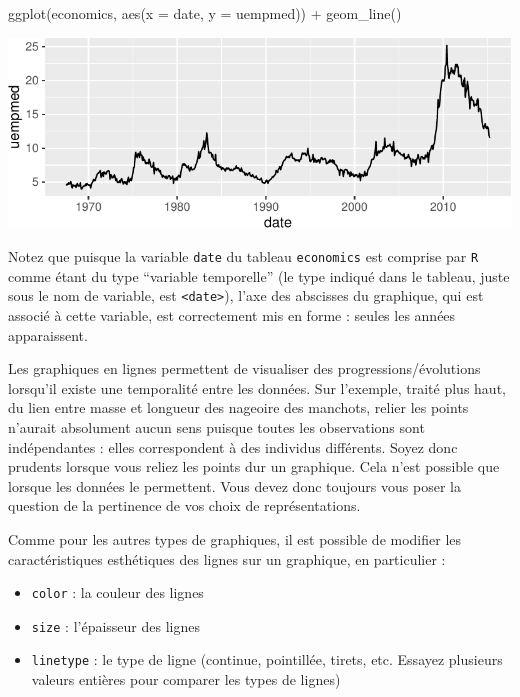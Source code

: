 \documentclass[
  a4paper,
  DIV=11,
  numbers=noendperiod,
  oneside]{scrreprt}
\newenvironment{Shaded}{}{}
\newcommand{\AttributeTok}[1]{\textcolor[rgb]{0.84,0.23,0.29}{#1}}
\newcommand{\FunctionTok}[1]{\textcolor[rgb]{0.44,0.26,0.76}{#1}}
\newcommand{\NormalTok}[1]{\textcolor[rgb]{0.14,0.16,0.18}{#1}}
\newcommand{\SpecialCharTok}[1]{\textcolor[rgb]{0.00,0.36,0.77}{#1}}
\providecommand{\tightlist}{%
  \setlength{\itemsep}{0pt}\setlength{\parskip}{0pt}}\usepackage{longtable,booktabs,array}
\begin{document}
\begin{Shaded}
\begin{Highlighting}[]
\FunctionTok{ggplot}\NormalTok{(economics, }\FunctionTok{aes}\NormalTok{(}\AttributeTok{x =}\NormalTok{ date, }\AttributeTok{y =}\NormalTok{ uempmed)) }\SpecialCharTok{+}
  \FunctionTok{geom\_line}\NormalTok{()}
\end{Highlighting}
\end{Shaded}

\includegraphics{03-visualization_files/figure-pdf/unnamed-chunk-51-1.pdf}

Notez que puisque la variable \texttt{date} du tableau
\texttt{economics} est comprise par \texttt{R} comme étant du type
``variable temporelle'' (le type indiqué dans le tableau, juste sous le
nom de variable, est \texttt{\textless{}date\textgreater{}}), l'axe des
abscisses du graphique, qui est associé à cette variable, est
correctement mis en forme : seules les années apparaissent.

Les graphiques en lignes permettent de visualiser des
progressions/évolutions lorsqu'il existe une temporalité entre les
données. Sur l'exemple, traité plus haut, du lien entre masse et
longueur des nageoire des manchots, relier les points n'aurait
absolument aucun sens puisque toutes les observations sont indépendantes
: elles correspondent à des individus différents. Soyez donc prudents
lorsque vous reliez les points dur un graphique. Cela n'est possible que
lorsque les données le permettent. Vous devez donc toujours vous poser
la question de la pertinence de vos choix de représentations.

Comme pour les autres types de graphiques, il est possible de modifier
les caractéristiques esthétiques des lignes sur un graphique, en
particulier :

\begin{itemize}
\tightlist
\item
  \texttt{color} : la couleur des lignes
\item
  \texttt{size} : l'épaisseur des lignes
\item
  \texttt{linetype} : le type de ligne (continue, pointillée, tirets,
  etc. Essayez plusieurs valeurs entières pour comparer les types de
  lignes)
\end{itemize}
\end{document}
